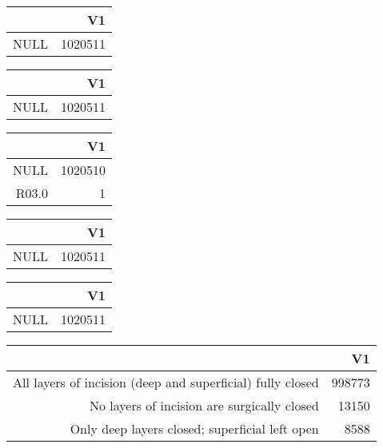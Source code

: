 \bigskip\bigskip
\centering
\begin{tabular}{rr}
  \hline
 & V1 \\ 
  \hline
NULL & 1020511 \\ 
   \hline
\end{tabular}

\bigskip\bigskip
\centering
\begin{tabular}{rr}
  \hline
 & V1 \\ 
  \hline
NULL & 1020511 \\ 
   \hline
\end{tabular}

\bigskip\bigskip
\centering
\begin{tabular}{rr}
  \hline
 & V1 \\ 
  \hline
NULL & 1020510 \\ 
  R03.0 &   1 \\ 
   \hline
\end{tabular}

\bigskip\bigskip
\centering
\begin{tabular}{rr}
  \hline
 & V1 \\ 
  \hline
NULL & 1020511 \\ 
   \hline
\end{tabular}

\bigskip\bigskip
\centering
\begin{tabular}{rr}
  \hline
 & V1 \\ 
  \hline
NULL & 1020511 \\ 
   \hline
\end{tabular}

\bigskip\bigskip
\centering
\begin{tabular}{rr}
  \hline
 & V1 \\ 
  \hline
All layers of incision (deep and superficial) fully closed & 998773 \\ 
  No layers of incision are surgically closed & 13150 \\ 
  Only deep layers closed; superficial left open & 8588 \\ 
   \hline
\end{tabular}

